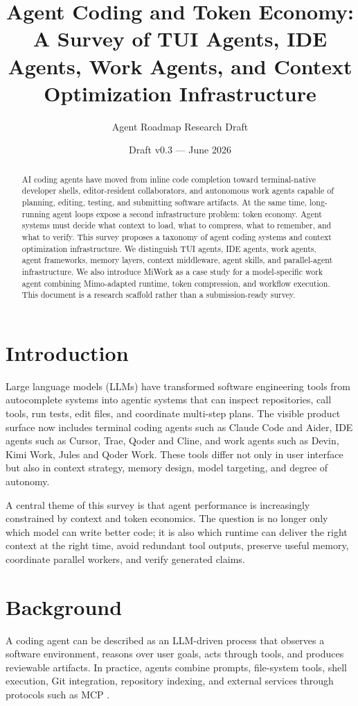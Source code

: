 \documentclass[11pt]{article}
\title{Agent Coding and Token Economy: A Survey of TUI Agents, IDE Agents, Work Agents, and Context Optimization Infrastructure}
\author{Agent Roadmap Research Draft}
\date{Draft v0.3 --- June 2026}
\begin{document}
\maketitle

\begin{abstract}
AI coding agents have moved from inline code completion toward terminal-native developer shells, editor-resident collaborators, and autonomous work agents capable of planning, editing, testing, and submitting software artifacts. At the same time, long-running agent loops expose a second infrastructure problem: token economy. Agent systems must decide what context to load, what to compress, what to remember, and what to verify. This survey proposes a taxonomy of agent coding systems and context optimization infrastructure. We distinguish TUI agents, IDE agents, work agents, agent frameworks, memory layers, context middleware, agent skills, and parallel-agent infrastructure. We also introduce MiWork as a case study for a model-specific work agent combining Mimo-adapted runtime, token compression, and workflow execution. This document is a research scaffold rather than a submission-ready survey.
\end{abstract}

\section{Introduction}
Large language models (LLMs) have transformed software engineering tools from autocomplete systems into agentic systems that can inspect repositories, call tools, run tests, edit files, and coordinate multi-step plans. The visible product surface now includes terminal coding agents such as Claude Code and Aider, IDE agents such as Cursor, Trae, Qoder and Cline, and work agents such as Devin, Kimi Work, Jules and Qoder Work. These tools differ not only in user interface but also in context strategy, memory design, model targeting, and degree of autonomy.

A central theme of this survey is that agent performance is increasingly constrained by context and token economics. The question is no longer only which model can write better code; it is also which runtime can deliver the right context at the right time, avoid redundant tool outputs, preserve useful memory, coordinate parallel workers, and verify generated claims.

\section{Background}
A coding agent can be described as an LLM-driven process that observes a software environment, reasons over user goals, acts through tools, and produces reviewable artifacts. In practice, agents combine prompts, file-system tools, shell execution, Git integration, repository indexing, and external services through protocols such as MCP \cite{mcp}.
\end{document}
